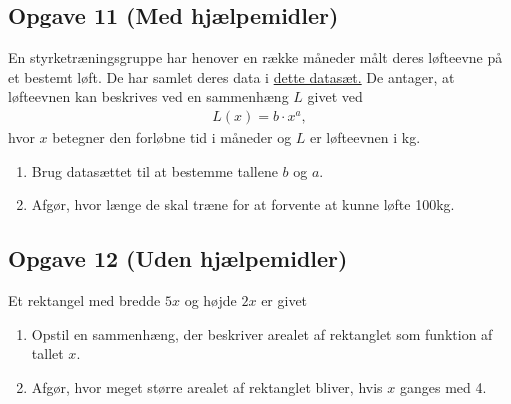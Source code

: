 \documentclass[12pt]{article}
\begin{document}
\subsection*{Opgave 11 (Med hjælpemidler)}

En styrketræningsgruppe har henover en række måneder målt deres løfteevne på et bestemt løft. De har samlet deres data i \href{https://github.com/ChristianJLex/TeachingNotes/raw/master/2024-2025/Data og lign/Traening.xlsx}{\color{blue!60} dette datasæt.} De antager, at løfteevnen kan beskrives ved en sammenhæng $L$ givet ved 
\begin{align*}
	L(x) = b\cdot x^a,
\end{align*}
hvor $x$ betegner den forløbne tid i måneder og $L$ er løfteevnen i kg. 

\begin{enumerate}[label=\roman*)]
	\item Brug datasættet til at bestemme tallene $b$ og $a$. 
	\item Afgør, hvor længe de skal træne for at forvente at kunne løfte 100kg.
\end{enumerate}

\subsection*{Opgave 12 (Uden hjælpemidler)}

Et rektangel med bredde $5x$ og højde $2x$ er givet
\begin{enumerate}[label=\roman*)]
	\item Opstil en sammenhæng, der beskriver arealet af rektanglet som funktion af tallet $x$. 
	\item Afgør, hvor meget større arealet af rektanglet bliver, hvis $x$ ganges med 4. 
\end{enumerate}
\end{document}
